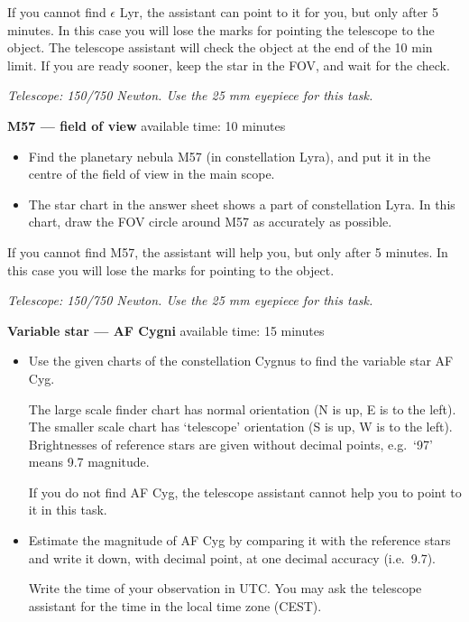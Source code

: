 If you cannot find $\epsilon$ Lyr, the assistant can point to it for you,
but only after 5 minutes. In this case you will lose the marks for pointing
the telescope to the object. The telescope assistant will check the object at
the end of the 10 min limit. If you are ready sooner, keep the star in the
FOV, and wait for the check.

\emph{Telescope: 150/750 Newton. Use the 25 mm eyepiece for this task.}

\textbf{M57 --- field of view} \hfill available time: 10 minutes

\begin{itemize}
\item Find the planetary nebula M57 (in constellation Lyra), and put it in
  the centre of the field of view in the main scope.
\item The star chart in the answer sheet shows a part of constellation Lyra.
  In this chart, draw the FOV circle around M57 as accurately as possible.
\end{itemize}

If you cannot find M57, the assistant will help you, but only after 5
minutes. In this case you will lose the marks for pointing to the object.


\emph{Telescope: 150/750 Newton. Use the 25 mm eyepiece for this task.}

\textbf{Variable star --- AF Cygni} \hfill available time: 15 minutes

\begin{itemize}
\item Use the given charts of the constellation Cygnus to find the variable
  star AF Cyg.

  The large scale finder chart has normal orientation (N is up, E is to the
  left). The smaller scale chart has `telescope' orientation (S is up, W is
  to the left). Brightnesses of reference stars are given without decimal
  points, e.g.\ `97' means 9.7 magnitude.

  If you do not find AF Cyg, the telescope assistant cannot help you to
  point to it in this task.
\item Estimate the magnitude of AF Cyg by comparing it with the reference
  stars and write it down, with decimal point, at one decimal accuracy
  (i.e.\ 9.7).

  Write the time of your observation in UTC. You may ask the telescope
  assistant for the time in the local time zone (CEST).
\end{itemize}

